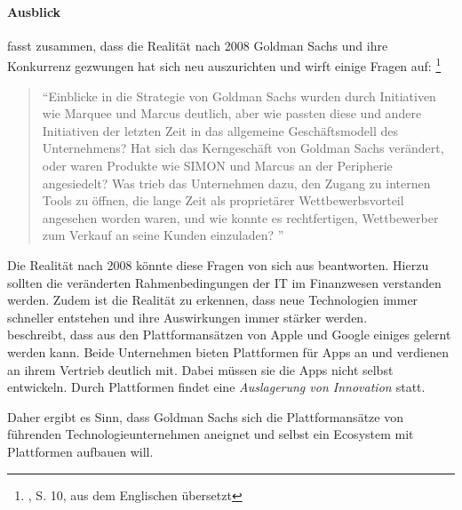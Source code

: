 \paragraph{Ausblick}
\citet{Gupta:2017} fasst zusammen, dass die Realität nach 2008 Goldman Sachs und ihre Konkurrenz gezwungen hat sich neu auszurichten und wirft einige Fragen auf: \footnote{\citet{Gupta:2017}, S. 10, aus dem Englischen übersetzt}
\begin{quote}
\enquote{Einblicke in die Strategie von Goldman Sachs wurden durch Initiativen wie Marquee und Marcus deutlich, aber wie passten diese und andere Initiativen der letzten Zeit in das allgemeine Geschäftsmodell des Unternehmens? Hat sich das Kerngeschäft von Goldman Sachs verändert, oder waren Produkte wie SIMON und Marcus an der Peripherie angesiedelt? Was trieb das Unternehmen dazu, den Zugang zu internen Tools zu öffnen, die lange Zeit als proprietärer Wettbewerbsvorteil angesehen worden waren, und wie konnte es rechtfertigen, Wettbewerber zum Verkauf an seine Kunden einzuladen?
    }
\end{quote}
Die Realität nach 2008 könnte diese Fragen von sich aus beantworten. Hierzu sollten die veränderten Rahmenbedingungen der IT im Finanzwesen verstanden werden. Zudem ist die Realität zu erkennen, dass neue Technologien immer schneller entstehen und ihre Auswirkungen immer stärker werden. 
\medskip
\\
\citet{Eismann2015} beschreibt, dass aus den Plattformansätzen von Apple und Google einiges gelernt werden kann. Beide Unternehmen bieten Plattformen für Apps an und verdienen an ihrem Vertrieb deutlich mit. Dabei müssen sie die Apps nicht selbst entwickeln. Durch Plattformen findet eine \emph{Auslagerung von Innovation \cite{Eismann2015}} statt.

Daher ergibt es Sinn, dass Goldman Sachs sich die Plattformansätze von führenden Technologieunternehmen aneignet und selbst ein Ecosystem mit Plattformen aufbauen will. 


